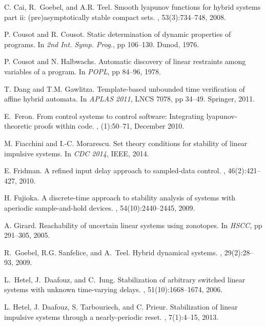 \documentclass[letterpaper, 10 pt, conference]{ieeeconf}  %
\numberwithin{thm}{section}
\begin{document}
\begin{thebibliography}{10}
C. Cai, R.~Goebel, and A.R. Teel.
\newblock Smooth lyapunov functions for hybrid systems part ii:
  (pre)asymptotically stable compact sets.
, 53(3):734--748, 2008.

P. Cousot and R. Cousot.
\newblock Static determination of dynamic properties of programs.
\newblock In {\em 2nd Int. Symp. Prog.}, pp 106--130. Dunod, 1976.

P. Cousot and N. Halbwachs.
\newblock Automatic discovery of linear restraints among variables of a
  program.
\newblock In {\em POPL}, pp 84--96, 1978.

T. Dang and T.M. Gawlitza.
\newblock Template-based unbounded time verification of affine hybrid automata.
\newblock In {\em APLAS 2011}, LNCS 7078, pp 34--49. Springer, 2011.

E.~Feron.
\newblock From control systems to control software: Integrating
  lyapunov-theoretic proofs within code.
, (1):50--71, December 2010.

M. Fiacchini and I.-C. Morarescu.
\newblock Set theory conditions for stability of linear impulsive systems.
\newblock In {\em CDC 2014}, IEEE, 2014.

E. Fridman.
\newblock A refined input delay approach to sampled-data control.
, 46(2):421--427, 2010.

H. Fujioka.
\newblock A discrete-time approach to stability analysis of systems with
  aperiodic sample-and-hold devices.
, 54(10):2440--2445,
  2009.

A. Girard.
\newblock Reachability of uncertain linear systems using zonotopes.
\newblock In {\em HSCC}, pp 291--305, 2005.

R.~Goebel, R.G. Sanfelice, and A.~Teel.
\newblock Hybrid dynamical systems.
, 29(2):28--93, 2009.

L.~Hetel, J.~Daafouz, and C.~Iung.
\newblock Stabilization of arbitrary switched linear systems with unknown
  time-varying delays.
, 51(10):1668--1674,
  2006.

L. Hetel, J. Daafouz, S. Tarbouriech, and C. Prieur.
\newblock Stabilization of linear impulsive systems through a nearly-periodic
  reset.
, 7(1):4--15, 2013.


\end{thebibliography}
\end{document}
